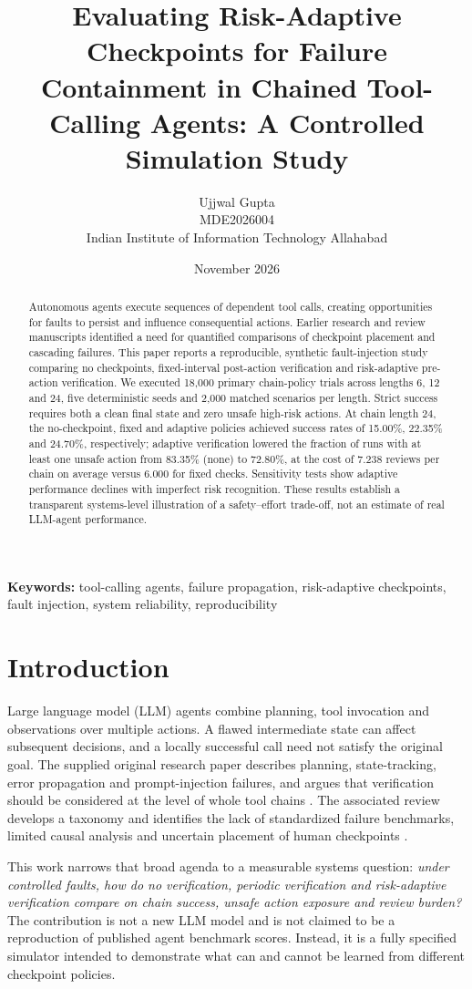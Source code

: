 \documentclass[10pt,a4paper]{article}
\title{Evaluating Risk-Adaptive Checkpoints for Failure Containment in Chained Tool-Calling Agents: A Controlled Simulation Study}
\author{Ujjwal Gupta\\MDE2026004\\Indian Institute of Information Technology Allahabad}
\date{November 2026}
\begin{document}
\maketitle
\begin{abstract}
Autonomous agents execute sequences of dependent tool calls, creating opportunities for faults to persist and influence consequential actions. Earlier research and review manuscripts identified a need for quantified comparisons of checkpoint placement and cascading failures. This paper reports a reproducible, synthetic fault-injection study comparing no checkpoints, fixed-interval post-action verification and risk-adaptive pre-action verification. We executed 18,000 primary chain-policy trials across lengths 6, 12 and 24, five deterministic seeds and 2,000 matched scenarios per length. Strict success requires both a clean final state and zero unsafe high-risk actions. At chain length 24, the no-checkpoint, fixed and adaptive policies achieved success rates of 15.00\%, 22.35\% and 24.70\%, respectively; adaptive verification lowered the fraction of runs with at least one unsafe action from 83.35\% (none) to 72.80\%, at the cost of 7.238 reviews per chain on average versus 6.000 for fixed checks. Sensitivity tests show adaptive performance declines with imperfect risk recognition. These results establish a transparent systems-level illustration of a safety--effort trade-off, not an estimate of real LLM-agent performance.
\end{abstract}
\noindent\textbf{Keywords:} tool-calling agents, failure propagation, risk-adaptive checkpoints, fault injection, system reliability, reproducibility
\section{Introduction}
Large language model (LLM) agents combine planning, tool invocation and observations over multiple actions. A flawed intermediate state can affect subsequent decisions, and a locally successful call need not satisfy the original goal. The supplied original research paper describes planning, state-tracking, error propagation and prompt-injection failures, and argues that verification should be considered at the level of whole tool chains \cite{gupta_original}. The associated review develops a taxonomy and identifies the lack of standardized failure benchmarks, limited causal analysis and uncertain placement of human checkpoints \cite{gupta_review}.

This work narrows that broad agenda to a measurable systems question: \emph{under controlled faults, how do no verification, periodic verification and risk-adaptive verification compare on chain success, unsafe action exposure and review burden?} The contribution is not a new LLM model and is not claimed to be a reproduction of published agent benchmark scores. Instead, it is a fully specified simulator intended to demonstrate what can and cannot be learned from different checkpoint policies.
\end{document}

